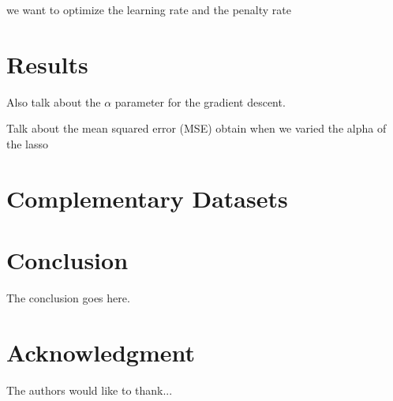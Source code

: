 \documentclass[conference]{IEEEtran}
\begin{document}
we want to optimize the learning rate and the penalty rate

\section{Results}


Also talk about the $\alpha$ parameter for the gradient descent.

Talk about the mean squared error (MSE) obtain when we varied the alpha of the lasso 

\section{Complementary Datasets}


\section{Conclusion}
The conclusion goes here.






\section*{Acknowledgment}


The authors would like to thank...







%
%




%



\end{document}
